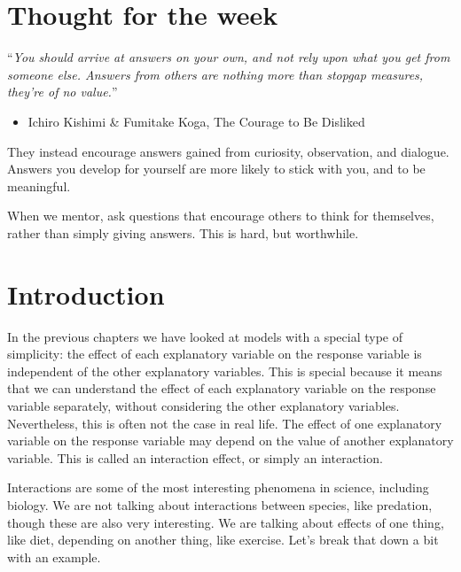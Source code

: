 \documentclass[
  letterpaper,
  8pt,
  a4paper]{book}
\providecommand{\tightlist}{%
  \setlength{\itemsep}{0pt}\setlength{\parskip}{0pt}}
\begin{document}
\section*{Thought for the week}\label{thought-for-the-week}


``\emph{You should arrive at answers on your own, and not rely upon what
you get from someone else. Answers from others are nothing more than
stopgap measures, they're of no value.}''

\begin{itemize}
\tightlist
\item
  Ichiro Kishimi \& Fumitake Koga, The Courage to Be Disliked
\end{itemize}

They instead encourage answers gained from curiosity, observation, and
dialogue. Answers you develop for yourself are more likely to stick with
you, and to be meaningful.

When we mentor, ask questions that encourage others to think for
themselves, rather than simply giving answers. This is hard, but
worthwhile.

\section*{Introduction}\label{introduction-4}


In the previous chapters we have looked at models with a special type of
simplicity: the effect of each explanatory variable on the response
variable is independent of the other explanatory variables. This is
special because it means that we can understand the effect of each
explanatory variable on the response variable separately, without
considering the other explanatory variables. Nevertheless, this is often
not the case in real life. The effect of one explanatory variable on the
response variable may depend on the value of another explanatory
variable. This is called an interaction effect, or simply an
interaction.

Interactions are some of the most interesting phenomena in science,
including biology. We are not talking about interactions between
species, like predation, though these are also very interesting. We are
talking about effects of one thing, like diet, depending on another
thing, like exercise. Let's break that down a bit with an example.
\end{document}

